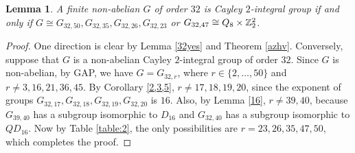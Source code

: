 \documentclass{amsart}
\newtheorem{lem}[thm]{Lemma}
\begin{document}
	
	\begin{lem}\label{32}
		A finite non-abelian $G$ of order $32$ is Cayley $2$-integral group if and only if $G\cong  G_{32,50}, G_{32,35}, G_{32,26}, G_{32,23}$ or $G_{32,47}\cong Q_8\times\Bbb Z_2^2$.
	\end{lem}
	\begin{proof}
		One direction is clear by Lemma \ref{32yes} and Theorem \ref{azhv}. Conversely, suppose that $G$ is a non-abelian Cayley $2$-integral group of order $32$. Since $G$ is non-abelian, by GAP, we have $G=G_{32,r}$, where $r\in\{2,\ldots,50\}$ and $r\neq 3,16,21,36,45$. By Corollary \ref{2,3,5}, $r\neq 17,18,19,20$, since the exponent of  groups $G_{32,17},G_{32,18},G_{32,19}, G_{32,20}$  is $16$. Also, by Lemma \ref{16}, $r\neq 39, 40$, because $G_{39,40}$ has a subgroup isomorphic to $D_{16}$ and $G_{32,40}$ has a subgroup isomorphic to $QD_{16}$. Now by Table \ref{table:2}, the only possibilities are $r=23,26,35,47,50$, which completes the proof.
	\end{proof}
	
\end{document}
